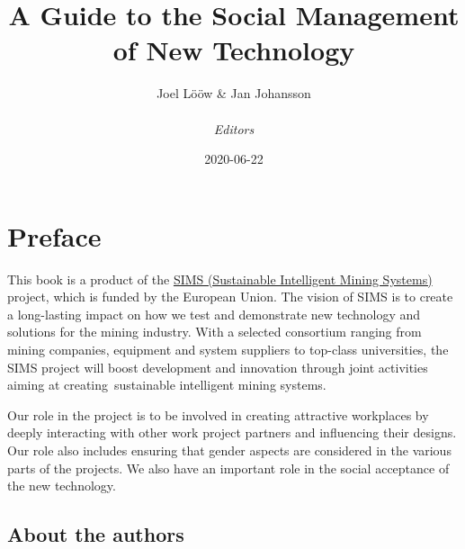 \documentclass[
  12pt,
]{scrbook}
\title{A Guide to the Social Management of New Technology}
\author{Joel Lööw \& Jan Johansson\\
~\\
\emph{Editors}}
\date{2020-06-22}
\begin{document}
\maketitle

{
\setcounter{tocdepth}{0}
\tableofcontents
}
\hypertarget{preface}{%
\chapter*{Preface}\label{preface}}

This book is a product of the \href{http://simsmining.eu}{SIMS (Sustainable Intelligent Mining
Systems)} project, which is funded by the European
Union. The vision of SIMS is to create a long-lasting impact on how we
test and demonstrate new technology and solutions for the mining
industry. With a selected consortium ranging from mining companies,
equipment and system suppliers to top-class universities, the SIMS
project will boost development and innovation through joint activities
aiming at creating~sustainable intelligent mining systems.

Our role in the project is to be involved in creating attractive
workplaces by deeply interacting with other work project partners and
influencing their designs. Our role also includes ensuring that gender
aspects are considered in the various parts of the projects. We also
have an important role in the social acceptance of the new technology.

\hypertarget{about-the-authors}{%
\section*{About the authors}\label{about-the-authors}}
\end{document}
